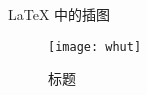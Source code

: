 \documentclass{ctexart}
\begin{document}
	\LaTeX{} 中的插图
	\begin{figure}[h] %
		\centering %
		\texttt{[image: whut]} %
		\caption{标题} %
		\label{whut} %
	\end{figure}%
\end{document}
